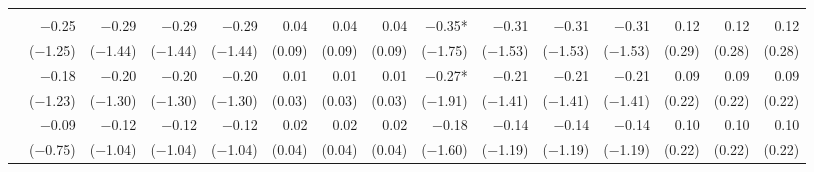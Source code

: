 \begin{tabularx}{1.45\textwidth}{lRRRRRRRRRRRRRR}
		\midrule
		 \\[\panelspacing]
		 & \num{-0.25}\phantom{***)} & \num{-0.29}\phantom{***)} & \num{-0.29}\phantom{***)} & \num{-0.29}\phantom{***)} & \num{0.04}\phantom{***)} & \num{0.04}\phantom{***)} & \num{0.04}\phantom{***)} & \num{-0.35}*\phantom{**)} & \num{-0.31}\phantom{***)} & \num{-0.31}\phantom{***)} & \num{-0.31}\phantom{***)} & \num{0.12}\phantom{***)} & \num{0.12}\phantom{***)} & \num{0.12}\phantom{***)} \\
		 & (\num{-1.25})\phantom{***} & (\num{-1.44})\phantom{***} & (\num{-1.44})\phantom{***} & (\num{-1.44})\phantom{***} & (\num{0.09})\phantom{***} & (\num{0.09})\phantom{***} & (\num{0.09})\phantom{***} & (\num{-1.75})\phantom{***} & (\num{-1.53})\phantom{***} & (\num{-1.53})\phantom{***} & (\num{-1.53})\phantom{***} & (\num{0.29})\phantom{***} & (\num{0.28})\phantom{***} & (\num{0.28})\phantom{***} \\ [\dspacing]
		 & \num{-0.18}\phantom{***)} & \num{-0.20}\phantom{***)} & \num{-0.20}\phantom{***)} & \num{-0.20}\phantom{***)} & \num{0.01}\phantom{***)} & \num{0.01}\phantom{***)} & \num{0.01}\phantom{***)} & \num{-0.27}*\phantom{**)} & \num{-0.21}\phantom{***)} & \num{-0.21}\phantom{***)} & \num{-0.21}\phantom{***)} & \num{0.09}\phantom{***)} & \num{0.09}\phantom{***)} & \num{0.09}\phantom{***)} \\
		 & (\num{-1.23})\phantom{***} & (\num{-1.30})\phantom{***} & (\num{-1.30})\phantom{***} & (\num{-1.30})\phantom{***} & (\num{0.03})\phantom{***} & (\num{0.03})\phantom{***} & (\num{0.03})\phantom{***} & (\num{-1.91})\phantom{***} & (\num{-1.41})\phantom{***} & (\num{-1.41})\phantom{***} & (\num{-1.41})\phantom{***} & (\num{0.22})\phantom{***} & (\num{0.22})\phantom{***} & (\num{0.22})\phantom{***} \\ [\dspacing]
		 & \num{-0.09}\phantom{***)} & \num{-0.12}\phantom{***)} & \num{-0.12}\phantom{***)} & \num{-0.12}\phantom{***)} & \num{0.02}\phantom{***)} & \num{0.02}\phantom{***)} & \num{0.02}\phantom{***)} & \num{-0.18}\phantom{***)} & \num{-0.14}\phantom{***)} & \num{-0.14}\phantom{***)} & \num{-0.14}\phantom{***)} & \num{0.10}\phantom{***)} & \num{0.10}\phantom{***)} & \num{0.10}\phantom{***)} \\
		 & (\num{-0.75})\phantom{***} & (\num{-1.04})\phantom{***} & (\num{-1.04})\phantom{***} & (\num{-1.04})\phantom{***} & (\num{0.04})\phantom{***} & (\num{0.04})\phantom{***} & (\num{0.04})\phantom{***} & (\num{-1.60})\phantom{***} & (\num{-1.19})\phantom{***} & (\num{-1.19})\phantom{***} & (\num{-1.19})\phantom{***} & (\num{0.22})\phantom{***} & (\num{0.22})\phantom{***} & (\num{0.22})\phantom{***} \\ [\dspacing]

\end{tabularx}
